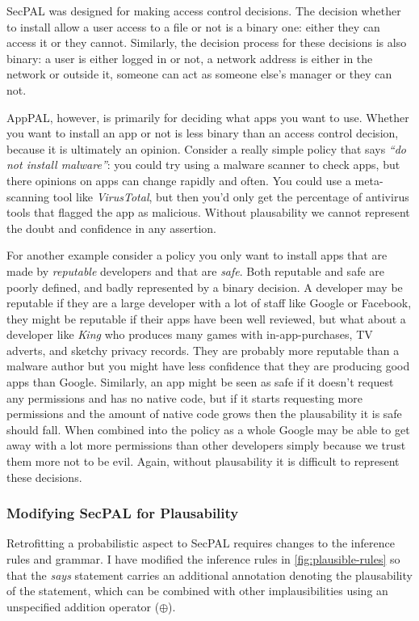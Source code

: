 \documentclass[a4paper]{scrartcl}
\begin{document}
SecPAL was designed for making access control decisions. The decision whether to
install allow a user access to a file or not is a binary one: either they can
access it or they cannot. Similarly, the decision process for these decisions is
also binary: a user is either logged in or not, a network address is either in
the network or outside it, someone can act as someone else's manager or they can
not.

AppPAL, however, is primarily for deciding what apps you want to use. Whether
you want to install an app or not is less binary than an access control
decision, because it is ultimately an opinion. Consider a really simple policy
that says \emph{``do not install malware''}: you could try using a malware
scanner to check apps, but there opinions on apps can change rapidly and often.
You could use a meta-scanning tool like \emph{VirusTotal}, but then you'd only
get the percentage of antivirus tools that flagged the app as malicious. Without
plausability we cannot represent the doubt and confidence in any assertion.

For another example consider a policy you only want to install apps that are
made by \emph{reputable} developers and that are \emph{safe}. Both reputable and
safe are poorly defined, and badly represented by a binary decision. A developer
may be reputable if they are a large developer with a lot of staff like Google
or Facebook, they might be reputable if their apps have been well reviewed, but
what about a developer like \emph{King} who produces many games with
in-app-purchases, TV adverts, and sketchy privacy records. They are probably
more reputable than a malware author but you might have less confidence that
they are producing good apps than Google. Similarly, an app might be seen as safe
if it doesn't request any permissions and has no native code, but if it starts
requesting more permissions and the amount of native code grows then the
plausability it is safe should fall. When combined into the policy as a whole
Google may be able to get away with a lot more permissions than other developers
simply because we trust them more not to be evil. Again, without plausability it
is difficult to represent these decisions.

\subsubsection*{Modifying SecPAL for Plausability}

Retrofitting a probabilistic aspect to SecPAL requires changes to the inference
rules and grammar. I have modified the inference rules in
\autoref{fig:plausible-rules} so that the \emph{says} statement carries an
additional annotation denoting the plausability of the statement, which can be
combined with other implausibilities using an unspecified addition operator
($\oplus$).
\end{document}
